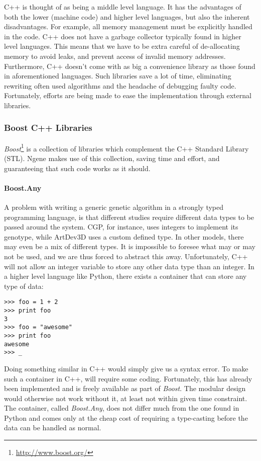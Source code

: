 C++ is thought of as being a middle level language. It has the advantages of both the lower (machine code) and higher level languages, but also the inherent disadvantages. For example, all memory management must be explicitly handled in the code. C++ does not have a garbage collector typically found in higher level languages. This means that we have to be extra careful of de-allocating memory to avoid leaks, and prevent access of invalid memory addresses. Furthermore, C++ doesn't come with as big a convenience library as those found in aforementioned languages. Such libraries save a lot of time, eliminating rewriting often used algorithms and the headache of debugging faulty code. Fortunately, efforts are being made to ease the implementation through external libraries.

\subsubsection{Boost C++ Libraries}
\emph{Boost}\footnote{\url{http://www.boost.org/}} is a collection of libraries which complement the C++ Standard Library (STL). Ngene makes use of this collection, saving time and effort, and guaranteeing that such code works as it should.

\paragraph{\textbf{Boost.Any}}\cite{henney2001}
A problem with writing a generic genetic algorithm in a strongly typed programming language, is that different studies require different data types to be passed around the system. CGP, for instance, uses integers to implement its genotype, while ArtDev3D uses a custom defined type. In other models, there may even be a mix of different types. It is impossible to foresee what may or may not be used, and we are thus forced to abstract this away. Unfortunately, C++ will not allow an integer variable to store any other data type than an integer. In a higher level language like Python, there exists a container that can store any type of data:

\begin{verbatim}
>>> foo = 1 + 2
>>> print foo
3
>>> foo = "awesome"
>>> print foo
awesome
>>> _
\end{verbatim}

Doing something similar in C++ would simply give us a syntax error. To make such a container in C++, will require some coding. Fortunately, this has already been implemented and is freely available as part of \emph{Boost}. The modular design would otherwise not work without it, at least not within given time constraint. The container, called \emph{Boost.Any}, does not differ much from the one found in Python and comes only at the cheap cost of requiring a type-casting before the data can be handled as normal.

